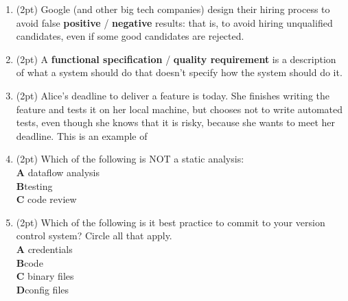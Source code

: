 \documentclass{report}
\newif\ifkey
\newcommand{\correct}[1]{\ifkey\color{red}\textbf{#1}\color{black}\else\textbf{#1}\fi\xspace}
\newcommand{\answershort}[1]{\ifkey\color{red}\underline{\textbf{#1}}\color{black}\else\underline{\hspace{3in}}\fi\xspace}
\newcommand{\vshortpts}{29}
\newcommand*{\pts}[1]{\addtocounter{points}{#1}(#1pt)}
\begin{document}
\begin{spacing}{1.4}
\begin{enumerate}[leftmargin=*]
  \newpage

  \textbf{II. Multiple Choice and Very Short Answer (\vshortpts pts).} In the following section, either circle your
  answer (possible answers appear in \textbf{bold}) or write a very short (one word or one phrase) answer in the space provided.

\item \pts{2} Google (and other big tech companies) design their hiring process
  to avoid false \correct{positive} / \textbf{negative} results: that is, to avoid hiring unqualified candidates,
  even if some good candidates are rejected.


\item \pts{2} A \correct{functional specification} / \textbf{quality requirement} is a description of what a system should do that doesn’t specify how the system should do it.

\item \pts{2} Alice's deadline to deliver a feature is today. She finishes writing the feature and tests it on her local machine, but chooses not to write automated tests,
  even though she knows that it is risky, because
  she wants to meet her deadline. This is an example of \answershort{technical debt}

\item \pts{2}
  Which of the following is NOT a static analysis:
  \\ \textbf{A}\hspace{0.2in} dataflow analysis
  \\ \correct{B}\hspace{0.2in}testing
  \\ \textbf{C}\hspace{0.2in} code review

\item \pts{2}
  Which of the following is it best practice to commit to your version control system? Circle all that apply.
  \\ \textbf{A}\hspace{0.2in} credentials
  \\ \correct{B}\hspace{0.2in}code
  \\ \textbf{C}\hspace{0.2in} binary files
  \\ \correct{D}\hspace{0.2in}config files


\end{enumerate}
\end{spacing}
\end{document}
